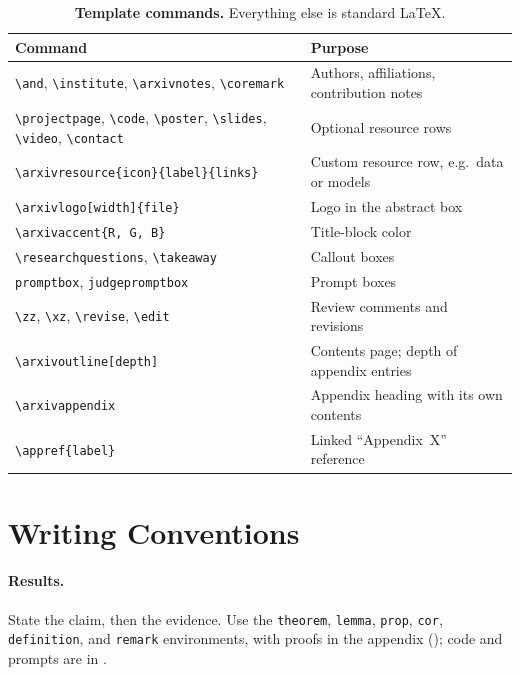 \documentclass[11pt]{article}
\begin{document}
\begin{table}[t]
\centering
\footnotesize
\setlength{\tabcolsep}{5pt}
\caption{\textbf{Template commands.} Everything else is standard \LaTeX.}
\label{tab:commands}
\begin{tabular}{@{} l l @{}}
\toprule
Command & Purpose \\
\midrule
\texttt{\textbackslash and}, \texttt{\textbackslash institute}, \texttt{\textbackslash arxivnotes}, \texttt{\textbackslash coremark} & Authors, affiliations, contribution notes \\
\texttt{\textbackslash projectpage}, \texttt{\textbackslash code}, \texttt{\textbackslash poster}, \texttt{\textbackslash slides}, \texttt{\textbackslash video}, \texttt{\textbackslash contact} & Optional resource rows \\
\texttt{\textbackslash arxivresource\{icon\}\{label\}\{links\}} & Custom resource row, e.g.\ data or models \\
\texttt{\textbackslash arxivlogo[width]\{file\}} & Logo in the abstract box \\
\texttt{\textbackslash arxivaccent\{R, G, B\}} & Title-block color \\
\texttt{\textbackslash researchquestions}, \texttt{\textbackslash takeaway} & Callout boxes \\
\texttt{promptbox}, \texttt{judgepromptbox} & Prompt boxes \\
\texttt{\textbackslash zz}, \texttt{\textbackslash xz}, \texttt{\textbackslash revise}, \texttt{\textbackslash edit} & Review comments and revisions \\
\texttt{\textbackslash arxivoutline[depth]} & Contents page; depth of appendix entries \\
\texttt{\textbackslash arxivappendix} & Appendix heading with its own contents \\
\texttt{\textbackslash appref\{label\}} & Linked ``Appendix~X'' reference \\
\bottomrule
\end{tabular}
\end{table}

\section{Writing Conventions}

\paragraph{Results.} State the claim, then the evidence. Use the \texttt{theorem}, \texttt{lemma}, \texttt{prop}, \texttt{cor}, \texttt{definition}, and \texttt{remark} environments, with proofs in the appendix (); code and prompts are in .
\end{document}
